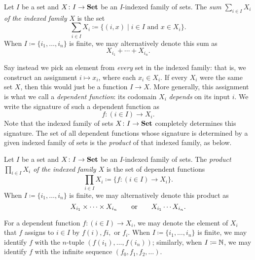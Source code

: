 \documentclass[Book-Poly]{subfiles}
\begin{document}
\begin{definition} \label{def.sum_sets}
    Let $I$ be a set and $X\colon I\to\mathbf{Set}$ be an $I$-indexed family of sets.
    The \emph{sum $\sum_{i\in I}X_i$ of the indexed family $X$} is the set
    \[
    \sum_{i\in I}X_i\coloneqq\{(i,x)\mid i\in I\text{ and }x\in X_i\}.
    \]
    When $I\coloneqq\{i_1,\ldots,i_n\}$ is finite, we may alternatively denote this sum as
    \[
    X_{i_1}+\cdots+X_{i_n}.
    \]
\end{definition}

Say instead we pick an element from \emph{every} set in the indexed family: that is, we construct an assignment $i\mapsto x_i$, where each $x_i\in X_i$.
If every $X_i$ were the same set $X$, then this would just be a function $I\to X$.
More generally, this assignment is what we call a \emph{dependent function}: its codomain $X_i$ \emph{depends} on its input $i$.
We write the signature of such a dependent function as
\[
f \colon (i \in I) \to X_i.
\]
Note that the indexed family of sets $X\colon I\to\mathbf{Set}$ completely determines this signature.
The set of all dependent functions whose signature is determined by a given indexed family of sets is the \emph{product} of that indexed family, as below.

\begin{definition} \label{def.prod_sets}
    Let $I$ be a set and $X\colon I\to\mathbf{Set}$ be an $I$-indexed family of sets.
    The \emph{product $\prod_{i\in I}X_i$ of the indexed family $X$} is the set of dependent functions
    \[
    \prod_{i\in I}X_i\coloneqq\{f \colon (i \in I) \to X_i\}.
    \]
    When $I\coloneqq\{i_1,\ldots,i_n\}$ is finite, we may alternatively denote this product as
    \[
    X_{i_1}\times\cdots\times X_{i_n} \qquad\text{or}\qquad X_{i_1}\cdots X_{i_n}.
    \]
\end{definition}

For a dependent function $f\colon(i\in I)\to X_i$, we may denote the element of $X_i$ that $f$ assigns to $i\in I$ by $f(i), fi,$ or $f_i$.
When $I\coloneqq\{i_1,\ldots,i_n\}$ is finite, we may identify $f$ with the $n$-tuple $(f(i_1),\ldots,f(i_n))$; similarly, when $I\coloneqq\mathbb{N}$, we may identify $f$ with the infinite sequence $(f_0,f_1,f_2,\ldots)$.
\end{document}
